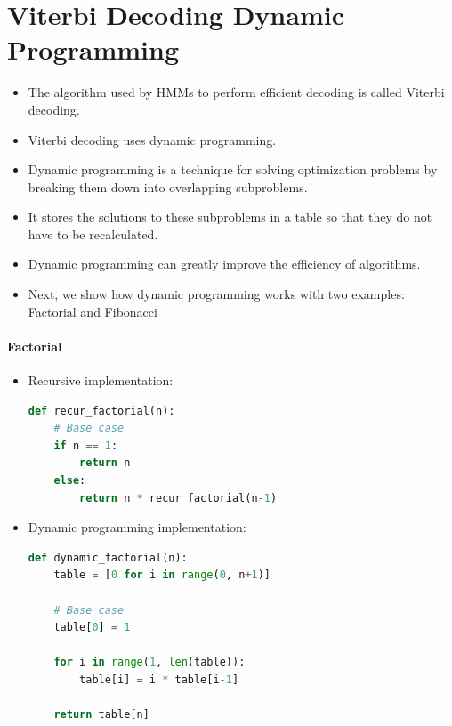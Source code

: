 \section{Viterbi Decoding Dynamic Programming}
  \begin{itemize}
    \item The algorithm used by HMMs to perform efficient decoding is called Viterbi decoding.
    \item Viterbi decoding uses dynamic programming.
    \item Dynamic programming is a technique for solving optimization problems by breaking them down into overlapping subproblems.
    \item It stores the solutions to these subproblems in a table so that they do not have to be recalculated.
    \item Dynamic programming can greatly improve the efficiency of algorithms.
    \item Next, we show how dynamic programming works with two examples: Factorial and Fibonacci
  \end{itemize}



\paragraph{Factorial}
 
  \begin{itemize}
    \item Recursive implementation:

    \begin{lstlisting}[language=Python]
def recur_factorial(n):
    # Base case
    if n == 1:
        return n
    else:
        return n * recur_factorial(n-1)
    \end{lstlisting}

    \item Dynamic programming implementation:

    \begin{lstlisting}[language=Python]
def dynamic_factorial(n):
    table = [0 for i in range(0, n+1)]

    # Base case
    table[0] = 1

    for i in range(1, len(table)):
        table[i] = i * table[i-1]

    return table[n]
    \end{lstlisting}

  \end{itemize}


